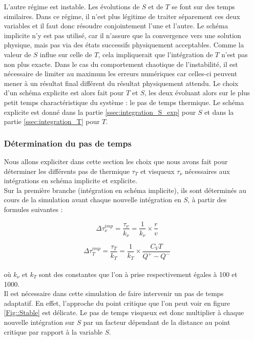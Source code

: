 L'autre régime est instable. Les évolutions de $S$ et de $T$ se font sur des temps similaires. Dans ce régime, il n'est plus légitime de traiter séparement ces deux variables et il faut donc résoudre conjointement l'une et l'autre. Le schéma implicite n'y est pas utilisé, car il n'assure que la convergence vers une solution physique, mais pas via des états successifs physiquement acceptables. Comme la valeur de $S$ influe sur celle de $T$, cela impliquerait que l'intégration de $T$ n'est pas non plus exacte. Dans le cas du comportement chaotique de l'instabilité, il est nécessaire de limiter au maximum les erreurs numériques car celles-ci peuvent mener à un résultat final différent du résultat physiquement attendu. Le choix d'un schéma explicite est alors fait pour $T$ et $S$, les deux évoluant alors sur le plus petit temps charactéristique du système : le pas de temps thermique. Le schéma explicite est donné dans la partie \ref{ssec:integration_S_exp} pour $S$ et dans la partie \ref{ssec:integration_T} pour $T$.

\subsubsection{Détermination du pas de temps\label{sec::pas_de_temps}}
Nous allons expliciter dans cette section les choix que nous avons fait pour déterminer les différents pas de thermique $\tau_T$ et visqueux $\tau_\nu$ nécessaires aux intégrations en schéma implicite et explicite. \\


Sur la première branche (intégration en schéma implicite), ils sont déterminés au cours de la simulation avant chaque nouvelle intégration en $S$, à partir des formules suivantes : 

\begin{equation}
	\Delta \tau_\nu^{imp} = \frac{\tau_\nu}{k_{\nu}} = \frac{1}{k_{\nu}} \times \frac{r}{v}
\end{equation}

\begin{equation}
	\Delta \tau_{T}^{imp} = \frac{\tau_{T}}{k_{T}}= \frac{1}{k_{T}} \times \frac{C_{V} T}{Q^{+} - Q^{-}}
\end{equation} \\

où $k_{\nu}$ et $k_{T}$ sont des constantes que l'on à prise respectivement égales à 100 et 1000. \\


Il est nécessaire dans cette simulation de faire intervenir un pas de temps adaptatif. En effet, l'approche du point critique que l'on peut voir en figure \ref{Fig::Stable} est délicate. Le pas de temps visqueux est donc multiplier
à chaque nouvelle intégration sur $S$ par un facteur dépendant de la distance au point critique par rapport à la variable $S$. 


